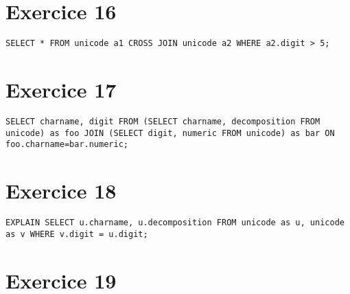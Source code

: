 \documentclass{cours}
\begin{document}
\section{Exercice 16}
\tt SELECT * FROM unicode a1 CROSS JOIN unicode a2 WHERE a2.digit > 5;

\section{Exercice 17}
\tt SELECT charname, digit FROM (SELECT charname, decomposition FROM unicode) as foo JOIN (SELECT digit, numeric FROM unicode) as bar ON foo.charname=bar.numeric;

\section{Exercice 18}
\tt EXPLAIN SELECT u.charname, u.decomposition FROM unicode as u, unicode as v WHERE v.digit = u.digit;

\section{Exercice 19}
\end{document}
